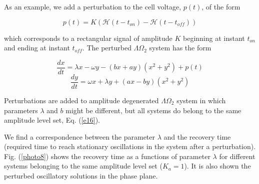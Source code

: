 As an example, we add a perturbation to the cell voltage, $p(t)$, of the form

\begin{equation}
    p(t) = K \left(\mathcal{H}(t-t_{on})-\mathcal{H}(t-t_{off})\right)
    \label{eq1}
\end{equation}

which corresponds to a rectangular signal of amplitude $K$ beginning at instant $t_{on}$ and ending at instant $t_{off}$. The perturbed $\Lambda \Omega_{2}$ system has the form

\begin{equation}
    \frac{dx}{dt} = \lambda x - \omega y - (bx + ay)(x^{2}+y^{2}) + p(t)
    \label{eq2}
\end{equation}
\begin{equation}
  \frac{dy}{dt} = \omega x + \lambda y + (ax - by)(x^{2}+y^{2})
  \label{eq3}
\end{equation}

Perturbations are added to amplitude degenerated $\Lambda \Omega_{2}$ system in which parameters $\lambda$ and $b$ might be different, but all systems do belong to the same amplitude level set, Eq. (\ref{e16}).

We find a correspondence between the parameter $\lambda$ and the recovery time (required time to reach stationary oscillations in the system after a perturbation). Fig. (\ref{photo8}) shows the recovery time as a functions of parameter $\lambda$ for different systems belonging to the same amplitude level set ($K_{a}=1$). It is also shown the perturbed oscillatory solutions in the phase plane.


